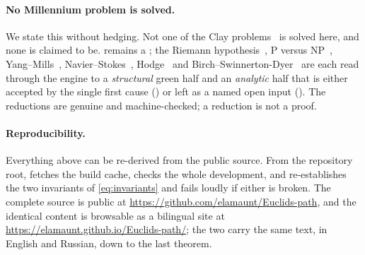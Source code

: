 \paragraph{No Millennium problem is solved.}
We state this without hedging. Not one of the Clay problems~\cite{millennium} is solved here, and
none is claimed to be.  remains a ; the Riemann
hypothesis~\cite{clay-rh}, $\mathrm{P}$ versus $\mathrm{NP}$~\cite{clay-pnp},
Yang--Mills~\cite{clay-ym}, Navier--Stokes~\cite{clay-ns}, Hodge~\cite{clay-hodge} and
Birch--Swinnerton-Dyer~\cite{clay-bsd} are each read through the engine to a \emph{structural}
green half and an \emph{analytic} half that is either accepted by the single first cause (\yellow{})
or left as a named open input (\red{}). The reductions are genuine and machine-checked; a reduction
is not a proof.

\paragraph{Reproducibility.}
Everything above can be re-derived from the public source. From the repository root,
 fetches the  build cache,  checks the whole
development, and  re-establishes the two invariants of
\cref{eq:invariants} and fails loudly if either is broken. The complete source is public at
\url{https://github.com/elamaunt/Euclids-path}, and the identical content is browsable as a
bilingual site at \url{https://elamaunt.github.io/Euclids-path/}; the two carry the same text, in
English and Russian, down to the last theorem.
